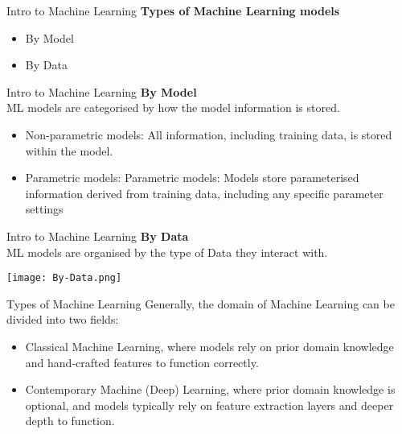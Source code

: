 \documentclass{beamer}
\begin{document}
\begin{frame}[fragile]{Intro to Machine Learning}
    \textbf{Types of Machine Learning models}\\
    \begin{itemize}
        \item By Model
        \item By Data
    \end{itemize}
\end{frame}

\begin{frame}[fragile]{Intro to Machine Learning}
    \textbf{By Model}\\
    ML models are categorised by how the model information is stored.
    \begin{itemize}
        \item Non-parametric models: All information, including training data, is stored within the model.
        \item Parametric models: Parametric models: Models store parameterised information derived from training data, including any specific parameter settings
    \end{itemize}
\end{frame}

\begin{frame}[fragile]{Intro to Machine Learning}
    \textbf{By Data}\\
    ML models are organised by the type of Data they interact with.
    \begin{center}
        \texttt{[image: By-Data.png]}
    \end{center}
\end{frame}

\begin{frame}[fragile]{Types of Machine Learning}
    Generally, the domain of Machine Learning can be divided into two fields:
    \begin{itemize}
        \item Classical Machine Learning, where models rely on prior domain knowledge and hand-crafted features to function correctly.
        \item Contemporary Machine (Deep) Learning, where prior domain knowledge is optional, and models typically rely on feature extraction layers and deeper depth to function.
    \end{itemize}
\end{frame}
\end{document}
